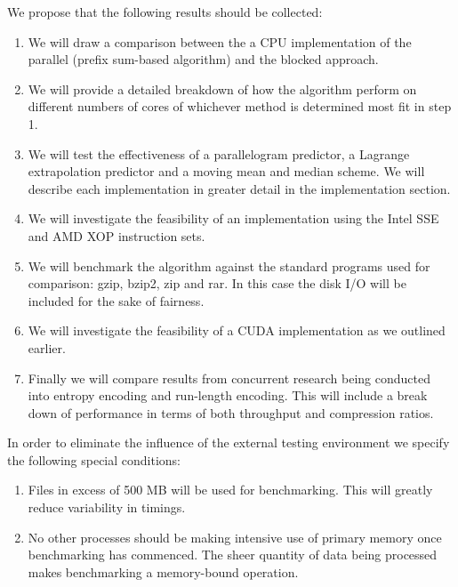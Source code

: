 We propose that the following results should be collected:
\begin{enumerate}
 \item We will draw a comparison between the a CPU implementation of the parallel (prefix sum-based algorithm) and the blocked approach.
 \item We will provide a detailed breakdown of how the algorithm perform on different numbers of cores of whichever method is determined most fit in step 1.
 \item We will test the effectiveness of a parallelogram predictor, a Lagrange extrapolation predictor \cite{engelson2000lossless} and a moving mean and median scheme. We will 
       describe each implementation in greater detail in the implementation section.
 \item We will investigate the feasibility of an implementation using the Intel SSE and AMD XOP instruction sets.
 \item We will benchmark the algorithm against the standard programs used for comparison: gzip, bzip2, zip and rar. In this case the disk I/O will be included for the sake of fairness.
 \item We will investigate the feasibility of a CUDA implementation as we outlined earlier.
 \item Finally we will compare results from concurrent research being conducted into entropy encoding and run-length encoding. This will include a break down of performance in terms of both throughput and compression ratios.
\end{enumerate}

In order to eliminate the influence of the external testing environment we specify the following special conditions:
\begin{enumerate}
 \item Files in excess of 500 MB will be used for benchmarking. This will greatly reduce variability in timings.
 \item No other processes should be making intensive use of primary memory once benchmarking has commenced. The sheer quantity of data being processed makes benchmarking a memory-bound operation.
\end{enumerate}
